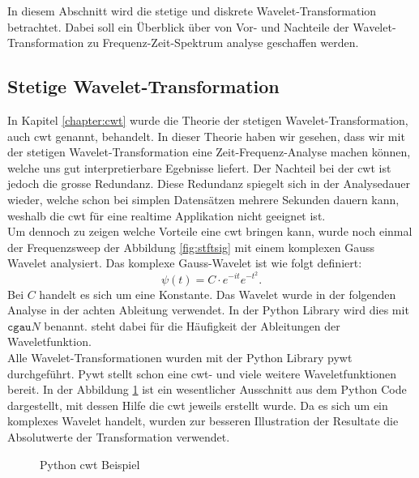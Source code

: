 
In diesem Abschnitt wird die stetige und diskrete Wavelet-Transformation betrachtet. Dabei soll ein Überblick über von Vor- und Nachteile der Wavelet-Transformation zu Frequenz-Zeit-Spektrum analyse geschaffen werden. 



\subsection{Stetige Wavelet-Transformation} 
In Kapitel \ref{chapter:cwt} wurde die Theorie der stetigen Wavelet-Transformation, auch cwt genannt, behandelt. In dieser Theorie haben wir gesehen, dass wir mit der stetigen Wavelet-Transformation eine Zeit-Frequenz-Analyse machen können, welche uns gut interpretierbare Egebnisse liefert. Der Nachteil bei der cwt ist jedoch die grosse Redundanz. Diese Redundanz spiegelt sich in der Analysedauer wieder, welche schon bei simplen Datensätzen mehrere Sekunden dauern kann, weshalb die cwt für eine realtime Applikation nicht geeignet ist.\\
Um dennoch zu zeigen welche Vorteile eine cwt bringen kann, wurde noch einmal der Frequenzsweep der Abbildung \ref{fig:stftsig} mit einem komplexen Gauss Wavelet analysiert. Das komplexe Gauss-Wavelet ist wie folgt definiert:
\begin{equation}
\psi(t)=C \cdot e^{-it} e^{-t^{2}}
\label{eq:cgau}.
\end{equation}
Bei $C$ handelt es sich um eine Konstante. Das Wavelet wurde in der folgenden Analyse in der achten Ableitung verwendet. In der Python Library wird dies mit $\texttt{cgau}N$ benannt.  steht dabei für die Häufigkeit der Ableitungen der Waveletfunktion.\\

Alle Wavelet-Transformationen wurden mit der Python Library pywt \cite{Lee2019PyWavelets} durchgeführt. Pywt stellt schon eine cwt- und viele weitere Waveletfunktionen bereit. In der Abbildung \ref{fig:python-cwt} ist ein wesentlicher Ausschnitt aus dem Python Code dargestellt, mit dessen Hilfe die cwt jeweils erstellt wurde. Da es sich um ein komplexes Wavelet handelt, wurden zur besseren Illustration der Resultate die Absolutwerte der Transformation verwendet.\\

\begin{figure}[!ht]
	\centering
	
	\caption{Python cwt Beispiel}
	\label{fig:python-cwt}
\end{figure}

